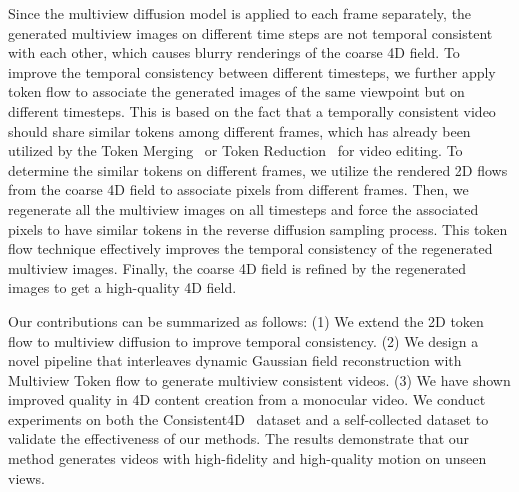Since the multiview diffusion model is applied to each frame separately, the generated multiview images on different time steps are not temporal consistent with each other, which causes blurry renderings of the coarse 4D field. To improve the temporal consistency between different timesteps, we further apply token flow to associate the generated images of the same viewpoint but on different timesteps. This is based on the fact that a temporally consistent video should share similar tokens among different frames, which has already been utilized by the Token Merging~\citep{li2024vidtome} or Token Reduction~\citep{geyer2023tokenflow} for video editing. To determine the similar tokens on different frames, we utilize the rendered 2D flows from the coarse 4D field to associate pixels from different frames. Then, we regenerate all the multiview images on all timesteps and force the associated pixels to have similar tokens in the reverse diffusion sampling process. This token flow technique effectively improves the temporal consistency of the regenerated multiview images. Finally, the coarse 4D field is refined by the regenerated images to get a high-quality 4D field.


Our contributions can be summarized as follows: (1) We extend the 2D token flow to multiview diffusion to improve temporal consistency. (2) We design a novel pipeline that interleaves dynamic Gaussian field reconstruction with Multiview Token flow to generate multiview consistent videos. (3) We have shown improved quality in 4D content creation from a monocular video.
We conduct experiments on both the Consistent4D~\citep{jiang2023consistent4d} dataset and a self-collected dataset to validate the effectiveness of our methods. The results demonstrate that our method generates videos with high-fidelity and high-quality motion on unseen views.